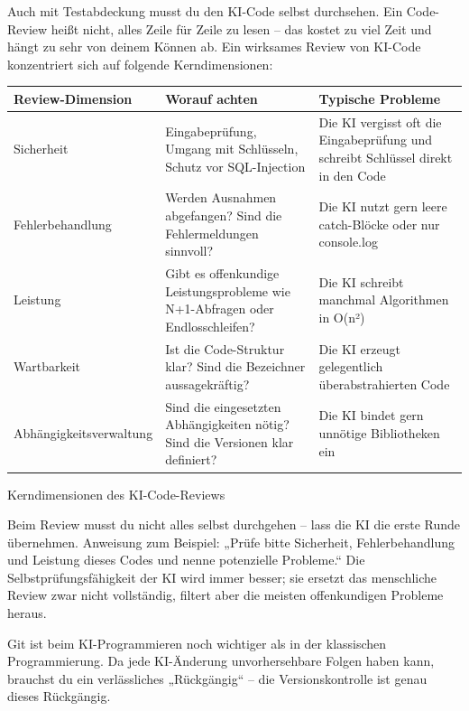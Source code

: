 
Auch mit Testabdeckung musst du den KI-Code selbst durchsehen. Ein Code-Review heißt nicht, alles Zeile für Zeile zu lesen – das kostet zu viel Zeit und hängt zu sehr von deinem Können ab. Ein wirksames Review von KI-Code konzentriert sich auf folgende Kerndimensionen:

\begin{center}
\begin{tabularx}{\linewidth}{|X|X|X|}
\hline
\textbf{Review-Dimension} & \textbf{Worauf achten} & \textbf{Typische Probleme} \tabularnewline
\hline
Sicherheit & Eingabeprüfung, Umgang mit Schlüsseln, Schutz vor SQL-Injection & Die KI vergisst oft die Eingabeprüfung und schreibt Schlüssel direkt in den Code \tabularnewline
Fehlerbehandlung & Werden Ausnahmen abgefangen? Sind die Fehlermeldungen sinnvoll? & Die KI nutzt gern leere catch-Blöcke oder nur console.log \tabularnewline
Leistung & Gibt es offenkundige Leistungsprobleme wie N+1-Abfragen oder Endlosschleifen? & Die KI schreibt manchmal Algorithmen in O(n²) \tabularnewline
Wartbarkeit & Ist die Code-Struktur klar? Sind die Bezeichner aussagekräftig? & Die KI erzeugt gelegentlich überabstrahierten Code \tabularnewline
Abhängigkeitsverwaltung & Sind die eingesetzten Abhängigkeiten nötig? Sind die Versionen klar definiert? & Die KI bindet gern unnötige Bibliotheken ein \tabularnewline
\hline
\end{tabularx}
\end{center}

\begin{center}\small\color{gray}Kerndimensionen des KI-Code-Reviews\end{center}

Beim Review musst du nicht alles selbst durchgehen – lass die KI die erste Runde übernehmen. Anweisung zum Beispiel: „Prüfe bitte Sicherheit, Fehlerbehandlung und Leistung dieses Codes und nenne potenzielle Probleme.“ Die Selbstprüfungsfähigkeit der KI wird immer besser; sie ersetzt das menschliche Review zwar nicht vollständig, filtert aber die meisten offenkundigen Probleme heraus.


Git ist beim KI-Programmieren noch wichtiger als in der klassischen Programmierung. Da jede KI-Änderung unvorhersehbare Folgen haben kann, brauchst du ein verlässliches „Rückgängig“ – die Versionskontrolle ist genau dieses Rückgängig.

